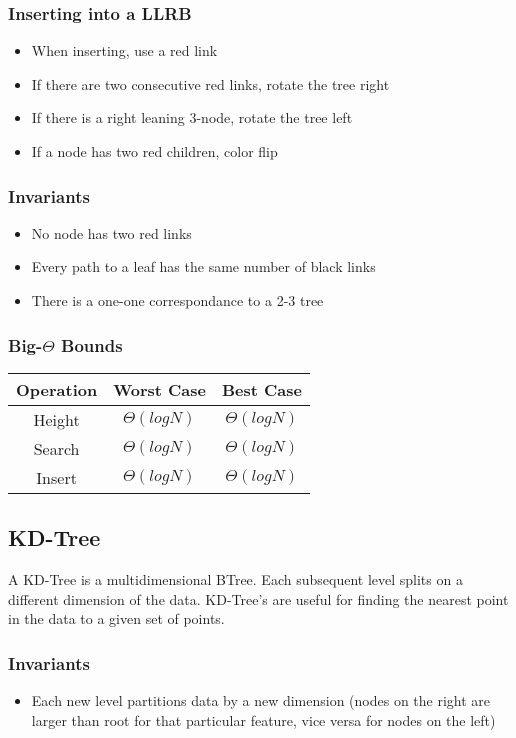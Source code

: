\documentclass{article}
\begin{document}
\subsubsection{Inserting into a LLRB}
\begin{itemize}
    \item When inserting, use a red link
    \item If there are two consecutive red links, rotate the tree right
    \item If there is a right leaning 3-node, rotate the tree left
    \item If a node has two red children, color flip
\end{itemize}
\subsubsection{Invariants}
\begin{itemize}
    \item No node has two red links
    \item Every path to a leaf has the same number of black links
    \item There is a one-one correspondance to a 2-3 tree
\end{itemize}
\subsubsection{Big-$\Theta$ Bounds}
\begin{center}
    \begin{tabular}{ c | c | c }
     Operation & Worst Case & Best Case\\
     \hline
     Height & $\Theta(log N)$ & $\Theta(log N)$ \\ 
     Search & $\Theta(log N)$ & $\Theta(log N)$ \\  
     Insert & $\Theta(log N)$ & $\Theta(log N)$  
    \end{tabular}
\end{center}
\subsection{KD-Tree}
A KD-Tree is a multidimensional BTree. Each subsequent level splits on a different dimension of the data.
KD-Tree's are useful for finding the nearest point in the data to a given set of points.
\subsubsection{Invariants}
\begin{itemize}
    \item Each new level partitions data by a new dimension (nodes on the right are larger than root for that particular feature, vice versa for nodes on the left)
\end{itemize}
\end{document}
